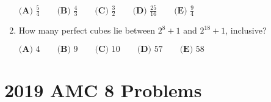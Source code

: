 \documentclass{article}
\begin{document}
\begin{enumerate}[label=\arabic*., itemsep=0.5em]
\(\textbf{(A) } \frac{5}{4} \qquad \textbf{(B) } \frac{4}{3} \qquad \textbf{(C) } \frac{3}{2} \qquad \textbf{(D) } \frac{25}{16} \qquad \textbf{(E) } \frac{9}{4}\)\par \vspace{0.5em}\item How many perfect cubes lie between \(2^8+1\) and \(2^{18}+1\), inclusive?

\(\textbf{(A) }4\qquad\textbf{(B) }9\qquad\textbf{(C) }10\qquad\textbf{(D) }57\qquad \textbf{(E) }58\)\par \vspace{0.5em}\end{enumerate}\newpage\section*{2019 AMC 8 Problems}
\end{document}
